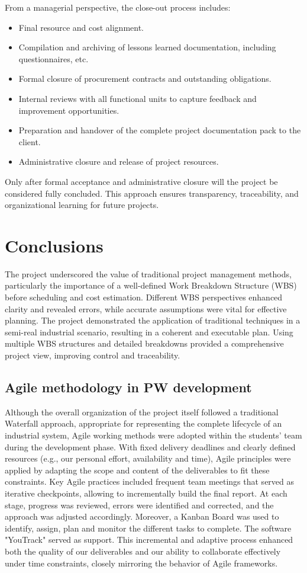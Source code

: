 From a managerial perspective, the close-out process includes:
\begin{itemize}
    \item Final resource and cost alignment.
    \item Compilation and archiving of lessons learned documentation, including questionnaires, etc.
    \item Formal closure of procurement contracts and outstanding obligations.
    \item Internal reviews with all functional units to capture feedback and improvement opportunities.
    \item Preparation and handover of the complete project documentation pack to the client.
    \item Administrative closure and release of project resources.
\end{itemize}

Only after formal acceptance and administrative closure will the project be considered fully concluded. This approach ensures transparency, traceability, and organizational learning for future projects.

\section{Conclusions}
The project underscored the value of traditional project management methods, particularly the importance of a well-defined Work Breakdown Structure (WBS) before scheduling and cost estimation. Different WBS perspectives enhanced clarity and revealed errors, while accurate assumptions were vital for effective planning.
The project demonstrated the application of traditional techniques in a semi-real industrial scenario, resulting in a coherent and executable plan. Using multiple WBS structures and detailed breakdowns provided a comprehensive project view, improving control and traceability.


\subsection{Agile methodology in PW development}
Although the overall organization of the project itself followed a traditional Waterfall approach, appropriate for representing the complete lifecycle of an industrial system, Agile working methods were adopted within the students' team during the development phase.
With fixed delivery deadlines and clearly defined resources (e.g., our personal effort, availability and time), Agile principles were applied by adapting the scope and content of the deliverables to fit these constraints. Key Agile practices included frequent team meetings that served as iterative checkpoints, allowing to incrementally build the final report.
At each stage, progress was reviewed, errors were identified and corrected, and the approach was adjusted accordingly.
Moreover, a Kanban Board was used to identify, assign, plan and monitor the different tasks to complete. The software "YouTrack" served as support.
This incremental and adaptive process enhanced both the quality of our deliverables and our ability to collaborate effectively under time constraints, closely mirroring the behavior of Agile frameworks.

